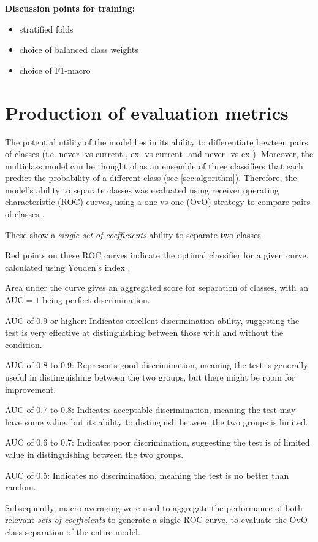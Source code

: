 \documentclass{article}
\begin{document}
\textbf{Discussion points for training:}
\begin{itemize}
    \item stratified folds
    \item choice of balanced class weights
    \item choice of F1-macro
\end{itemize}

\section*{Production of evaluation metrics}
The potential utility of the model lies in its ability to differentiate bewteen pairs of classes (i.e. never- vs current-, ex- vs current- and never- vs ex-). Moreover, the multiclass model can be thought of as an ensemble of three classifiers that each predict the probability of a different class (see \ref{sec:algorithm}). Therefore, the model's ability to separate classes was evaluated using receiver operating characteristic (ROC) curves, using a one vs one (OvO) strategy to compare pairs of classes \cite{scikit-learn-roc-example}. 

These show a \textit{single set of coefficients} ability to separate two classes. 

Red points on these ROC curves indicate the optimal classifier for a given curve, calculated using Youden's index \cite{youden1950index}. 

Area under the curve gives an aggregated score for separation of classes, with an AUC\(=1\) being perfect discrimination. 

AUC of 0.9 or higher:
Indicates excellent discrimination ability, suggesting the test is very effective at distinguishing between those with and without the condition. 

AUC of 0.8 to 0.9:
Represents good discrimination, meaning the test is generally useful in distinguishing between the two groups, but there might be room for improvement. 

AUC of 0.7 to 0.8:
Indicates acceptable discrimination, meaning the test may have some value, but its ability to distinguish between the two groups is limited. 

AUC of 0.6 to 0.7:
Indicates poor discrimination, suggesting the test is of limited value in distinguishing between the two groups. 

AUC of 0.5:
Indicates no discrimination, meaning the test is no better than random.


Subsequently, macro-averaging \cite{scikit-learn-roc-example} were used to aggregate the performance of both relevant \textit{sets of coefficients} to generate a single ROC curve, to evaluate the OvO class separation of the entire model. 
\end{document}
